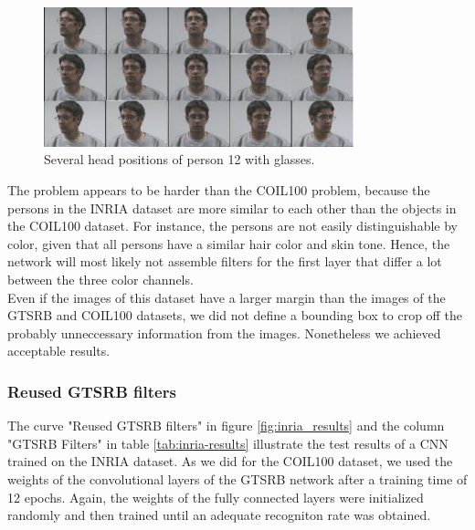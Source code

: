 \documentclass[11pt, a4paper]{article}
\begin{document}
\begin{figure}[h!]
	\centering
	\includegraphics[width=0.8\textwidth]{inria_different_angles}
	\caption{Several head positions of person 12 with glasses.}
	\label{fig:inria_different_angles}
\end{figure}

The problem appears to be harder than the COIL100 problem, because the persons in the INRIA dataset are more similar to each other than the objects in the COIL100 dataset. For instance, the persons are not easily distinguishable by color, given that all persons have a similar hair color and skin tone. Hence, the network will most likely not assemble filters for the first layer that differ a lot between the three color channels.\\
Even if the images of this dataset have a larger margin than the images of the GTSRB and COIL100 datasets, we did not define a bounding box to crop off the probably unneccessary information from the images. Nonetheless we achieved acceptable results.

\subsubsection{Reused GTSRB filters}

The curve "Reused GTSRB filters" in figure \ref{fig:inria_results} and the column "GTSRB Filters" in table \ref{tab:inria-results} illustrate the test results of a CNN trained on the INRIA dataset. As we did for the COIL100 dataset, we used the weights of the convolutional layers of the GTSRB network after a training time of 12 epochs. Again, the weights of the fully connected layers were initialized randomly and then trained until an adequate recogniton rate was obtained.
\end{document}
